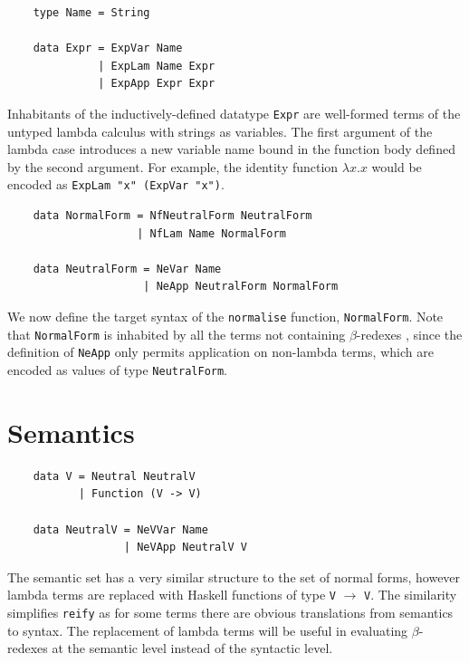 \begin{lstlisting}
    type Name = String

    data Expr = ExpVar Name
              | ExpLam Name Expr
              | ExpApp Expr Expr
\end{lstlisting}

Inhabitants of the inductively-defined datatype \lstinline{Expr} are well-formed terms of the untyped lambda calculus with strings as variables. The first argument of the lambda case introduces a new variable name bound in the function body defined by the second argument. For example, the identity function $\lambda x . x$ would be encoded as \lstinline{ExpLam "x" (ExpVar "x")}.

\begin{lstlisting}
    data NormalForm = NfNeutralForm NeutralForm
                    | NfLam Name NormalForm

    data NeutralForm = NeVar Name
                     | NeApp NeutralForm NormalForm
\end{lstlisting}

We now define the target syntax of the \lstinline{normalise} function, \lstinline{NormalForm}. Note that \lstinline{NormalForm} is inhabited by all the terms not containing $\beta$-redexes \cite{slides}, since the definition of \lstinline{NeApp} only permits application on non-lambda terms, which are encoded as values of type \lstinline{NeutralForm}.

\section{Semantics}

\begin{lstlisting}
    data V = Neutral NeutralV
           | Function (V -> V)

    data NeutralV = NeVVar Name
                  | NeVApp NeutralV V
\end{lstlisting}


The semantic set has a very similar structure to the set of normal forms, however lambda terms are replaced with Haskell functions of type \lstinline{V} $\rightarrow$ \lstinline{V}. The similarity simplifies \lstinline{reify} as for some terms there are obvious translations from semantics to syntax. The replacement of lambda terms will be useful in evaluating $\beta$-redexes at the semantic level instead of the syntactic level.

